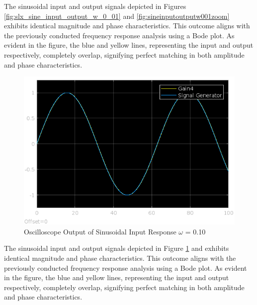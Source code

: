 \documentclass[12pt]{article}
\begin{document}
			The sinusoidal input and output signals depicted in Figures \ref{fig:slx_sine_input_output_w_0_01} and \ref{fig:sineinputoutputw001zoom} exhibits identical magnitude and phase characteristics. This outcome aligns with the previously conducted frequency response analysis using a Bode plot. As evident in the figure, the blue and yellow lines, representing the input and output respectively, completely overlap, signifying perfect matching in both amplitude and phase characteristics.
			\begin{figure}[H]
				\centering
				\includegraphics[width=1\linewidth]{"Code/Fig/sine_input_output_w_0_1.png"} 
				\caption{Oscilloscope Output of Sinusoidal Input Response $\omega$ = 0.10}
				\label{fig:slx_sine_input_output_w_0_10}
			\end{figure}	
			The sinusoidal input and output signals depicted in Figure \ref{fig:slx_sine_input_output_w_0_10} and exhibits identical magnitude and phase characteristics. This outcome aligns with the previously conducted frequency response analysis using a Bode plot. As evident in the figure, the blue and yellow lines, representing the input and output respectively, completely overlap, signifying perfect matching in both amplitude and phase characteristics.
\end{document}

